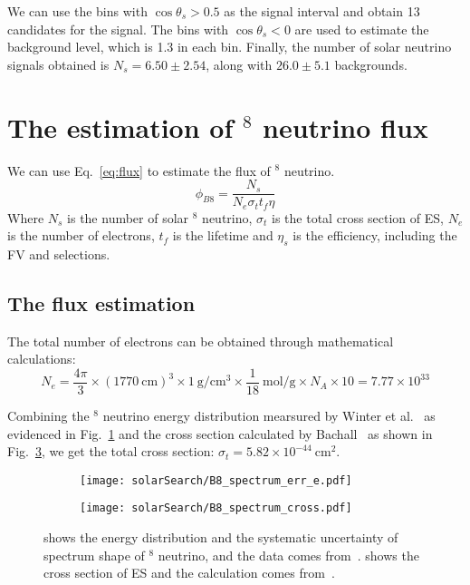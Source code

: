 We can use the bins with $\cos\theta_s > 0.5$ as the signal interval and obtain 13 candidates for the signal. The bins with $\cos\theta_s < 0$ are used to estimate the background level, which is 1.3 in each bin. Finally, the number of solar neutrino signals obtained is $N_s=6.50\pm2.54$, along with $26.0\pm5.1$ backgrounds.

\section{The estimation of $^8$ neutrino flux}
We can use Eq.~\eqref{eq:flux} to estimate the flux of $^8$ neutrino.
\begin{equation}
	\phi_{B8}=\frac{N_s}{N_e\sigma_t t_f \eta}
	\label{eq:flux}
\end{equation}
Where $N_s$ is the number of solar $^8$ neutrino, $\sigma_t$ is the total cross section of ES, $N_e$ is the number of electrons, $t_f$ is the lifetime and $\eta_s$ is the efficiency, including the  FV and selections.

\subsection{The flux estimation}
The total number of electrons can be obtained through mathematical calculations:
\begin{equation}
	N_e=\frac{4\pi}{3}\times (1770~\text{cm})^3\times 1~\text{g}/\text{cm}^3\times \frac{1}{18}~\text{mol}/\text{g}\times N_A\times 10=7.77\times10^{33}
\end{equation}

Combining the $^8$ neutrino energy distribution mearsured by Winter et al.~\cite{B8_winter} as evidenced in Fig.~\ref{fig:solar_B8_err_e} and the cross section calculated by Bachall~\cite{Bahcall_correct} as shown in Fig.~\ref{fig:solar_B8_cross}, we get the total cross section: $\sigma_t=5.82\times10^{-44}~\text{cm}^2$.
\begin{figure}[htbp]
	\centering
	\begin{subfigure}{0.5\textwidth}
		\centering
		\texttt{[image: solarSearch/B8\_spectrum\_err\_e.pdf]}
		\caption{}
		\label{fig:solar_B8_err_e}
	\end{subfigure}%
	\begin{subfigure}{0.5\textwidth}
		\centering
		\texttt{[image: solarSearch/B8\_spectrum\_cross.pdf]}
		\caption{}
		\label{fig:solar_B8_cross}
	\end{subfigure}
	\caption{ shows the energy distribution and the systematic uncertainty of spectrum shape of $^8$ neutrino, and the data comes from~\cite{B8_winter}.  shows the cross section of ES and the calculation comes from~\cite{Bahcall_correct}.}
\end{figure}


